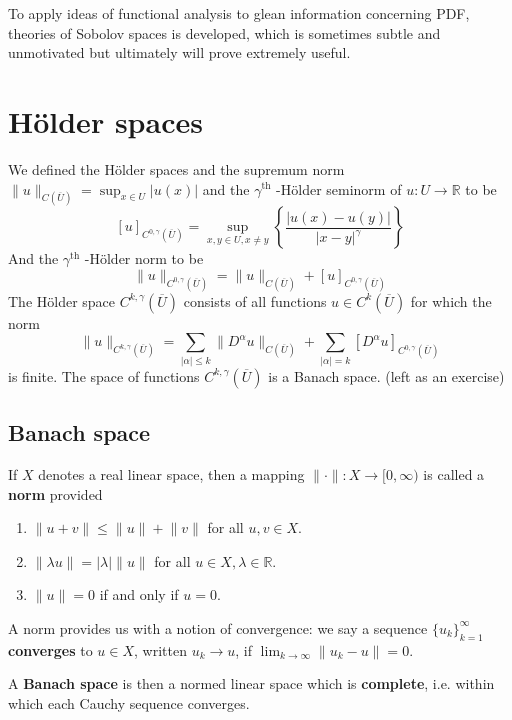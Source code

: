 To apply ideas of functional analysis to glean information concerning PDF, theories of Sobolov spaces is developed, which is sometimes subtle and unmotivated but ultimately will prove extremely useful.

\section{Hölder spaces}

We defined the Hölder spaces and the supremum norm $\lVert u \rVert_{C(\overline{U})}=\sup_{x\in U}\lvert u(x) \rvert$ and the $\gamma^{\text{th}}$ -Hölder seminorm of $u:U\to \mathbb{R}$ to be
\[
[u]_{C^{0,\gamma}(\overline{U})}=\sup_{x,y\in U,x\neq y}\left\{  \frac{\lvert u(x)-u(y) \rvert }{\lvert x-y \rvert ^{\gamma}}  \right\}
\]
And the $\gamma^{\text{th}}$ -Hölder norm to be
\[
\lVert u \rVert _{C^{0,\gamma}(\overline{U})}=\lVert u \rVert_{C(\overline{U})}+[u]_{C^{0,\gamma}(\overline{U})}
\]
The Hölder space $C^{k,\gamma}(\overline{U})$ consists of all functions $u\in C^{k}(\overline{U})$ for which the norm
\[
\lVert u \rVert _{C^{k,\gamma}(\overline{U})}=\sum_{\lvert \alpha \rvert \leq k}\lVert D^{\alpha}u \rVert _{C(\overline{U})}+\sum_{\lvert \alpha \rvert =k}[D^{\alpha}u]_{C^{0,\gamma}(\overline{U})}
\]
is finite. The space of functions $C^{k,\gamma}(\overline{U})$ is a Banach space. (left as an exercise)

\subsection{Banach space}

If $X$ denotes a real linear space, then a mapping $\lVert \cdot \rVert:X\to[0,\infty)$ is called a \textbf{norm} provided

\begin{enumerate}
	\item $\lVert u+v \rVert\leq \lVert u \rVert+\lVert v \rVert$ for all $u, v\in X$.
	\item $\lVert \lambda u \rVert=\lvert \lambda \rvert \lVert u \rVert$ for all $u\in X,\lambda\in \mathbb{R}$.
	\item $\lVert u \rVert=0$ if and only if $u=0$.
\end{enumerate}

A norm provides us with a notion of convergence: we say a sequence $\{ u_k \}_{k=1}^{\infty}$ \textbf{converges} to $u\in X$, written $u_k\to u$, if $\lim_{ k \to \infty }\lVert u_k-u \rVert=0$.

A \textbf{Banach space} is then a normed linear space which is \textbf{complete}, i.e. within which each Cauchy sequence converges.

